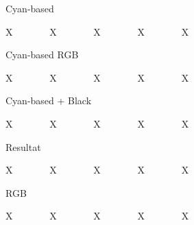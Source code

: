 \documentclass[
ngerman,
paper=a4,
asymmetric,
fontsize=10pt,
draft=false,
numbers=noenddot,
bibtotocnumbered,
footnotes=multiple,
toc=flat,
]{scrbook}
\begin{document}
\begin{WidePar}
{\bigskip
\noindent Cyan-based

\noindent\colorbox{DefaultA}{\textcolor{DefaultA}{X~~~~~}}~~
\colorbox{DefaultB}{\textcolor{DefaultB}{X~~~~~}}~~
\colorbox{DefaultC}{\textcolor{DefaultC}{X~~~~~}}~~
\colorbox{DefaultD}{\textcolor{DefaultD}{X~~~~~}}~~
\colorbox{DefaultE}{\textcolor{DefaultE}{X~~~~~}}~~


\bigskip
\noindent Cyan-based RGB

\noindent\colorbox{DefaultA}{\textcolor{DefaultA}{X~~~~~}}~~
\colorbox{DefaultB}{\textcolor{DefaultB}{X~~~~~}}~~
\colorbox{DefaultC}{\textcolor{DefaultC}{X~~~~~}}~~
\colorbox{DefaultD}{\textcolor{DefaultD}{X~~~~~}}~~
\colorbox{DefaultE}{\textcolor{DefaultE}{X~~~~~}}~~


\bigskip
\noindent Cyan-based + Black

\noindent\colorbox{DefaultA}{\textcolor{DefaultA}{X~~~~~}}~~
\colorbox{DefaultB}{\textcolor{DefaultB}{X~~~~~}}~~
\colorbox{DefaultC}{\textcolor{DefaultC}{X~~~~~}}~~
\colorbox{DefaultD}{\textcolor{DefaultD}{X~~~~~}}~~
\colorbox{DefaultE}{\textcolor{DefaultE}{X~~~~~}}~~

\bigskip
\noindent Resultat

\noindent\colorbox{DefaultA}{\textcolor{DefaultA}{X~~~~~}}~~
\colorbox{DefaultB}{\textcolor{DefaultB}{X~~~~~}}~~
\colorbox{DefaultC}{\textcolor{DefaultC}{X~~~~~}}~~
\colorbox{DefaultD}{\textcolor{DefaultD}{X~~~~~}}~~
\colorbox{DefaultE}{\textcolor{DefaultE}{X~~~~~}}~~
\bigskip
\bigskip

\noindent RGB

\noindent\colorbox{DefaultA}{\textcolor{DefaultA}{X~~~~~}}~~
\colorbox{DefaultB}{\textcolor{DefaultB}{X~~~~~}}~~
\colorbox{DefaultC}{\textcolor{DefaultC}{X~~~~~}}~~
\colorbox{DefaultD}{\textcolor{DefaultD}{X~~~~~}}~~
\colorbox{DefaultE}{\textcolor{DefaultE}{X~~~~~}}~~
\bigskip


}
\end{WidePar}
\end{document}

